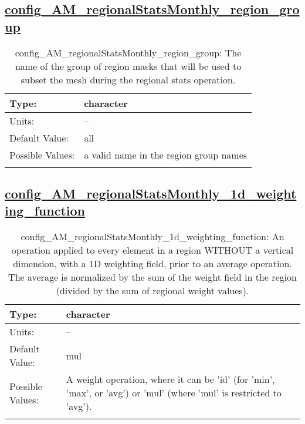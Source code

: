 \subsection[config\_AM\_regionalStatsMonthly\_region\_group]{\hyperref[sec:nm_tab_AM_regionalStatsMonthly]{config\_AM\_regionalStatsMonthly\_region\_group}}
\label{subsec:nm_sec_config_AM_regionalStatsMonthly_region_group}
\begin{center}
\begin{longtable}{| p{2.0in} || p{4.0in} |}
    \hline
    Type: & character \\
    \hline
    Units: & -- \\
    \hline
    Default Value: & all \\
    \hline
    Possible Values: & a valid name in the region group names \\
    \hline
    \caption{config\_AM\_regionalStatsMonthly\_region\_group: The name of the group of region masks that will be used to subset the mesh during the regional stats operation.}
\end{longtable}
\end{center}
\subsection[config\_AM\_regionalStatsMonthly\_1d\_weighting\_function]{\hyperref[sec:nm_tab_AM_regionalStatsMonthly]{config\_AM\_regionalStatsMonthly\_1d\_weighting\_function}}
\label{subsec:nm_sec_config_AM_regionalStatsMonthly_1d_weighting_function}
\begin{center}
\begin{longtable}{| p{2.0in} || p{4.0in} |}
    \hline
    Type: & character \\
    \hline
    Units: & -- \\
    \hline
    Default Value: & mul \\
    \hline
    Possible Values: & A weight operation, where it can be 'id' (for 'min', 'max', or 'avg') or 'mul' (where 'mul' is restricted to 'avg'). \\
    \hline
    \caption{config\_AM\_regionalStatsMonthly\_1d\_weighting\_function: An operation applied to every element in a region WITHOUT a vertical dimension, with a 1D weighting field, prior to an average operation. The average is normalized by the sum of the weight field in the region (divided by the sum of regional weight values).}
\end{longtable}
\end{center}
